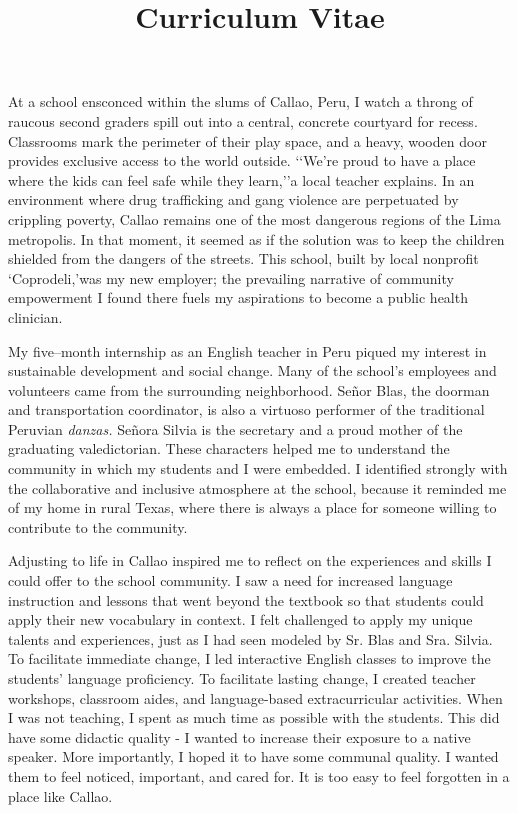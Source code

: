 \documentclass[12pt,a4paper,roman]{moderncv} %
\title{Curriculum Vitae}
\begin{document}


\clearpage


At a school ensconced within the slums of Callao, Peru, I watch a throng of raucous second graders spill out into a central, concrete courtyard for recess. Classrooms mark the perimeter of their play space, and a heavy, wooden door provides exclusive access to the world outside. \lq\lq We're proud to have a place where the kids can feel safe while they learn,\rq\rq\space a local teacher explains. In an environment where drug trafficking and gang violence are perpetuated by crippling poverty, Callao remains one of the most dangerous regions of the Lima metropolis. In that moment, it seemed as if the solution was to keep the children shielded from the dangers of the streets. This school, built by local nonprofit  \lq Coprodeli,\rq\space was my new employer; the prevailing narrative of community empowerment I found there fuels my aspirations to become a public health clinician.

\medskip
 
My five--month internship as an English teacher in Peru piqued my interest in sustainable development and social change. Many of the school's employees and volunteers came from the surrounding neighborhood. Se\~nor Blas, the doorman and transportation coordinator, is also a virtuoso performer of the traditional Peruvian \textit{danzas.} Se\~nora Silvia is the secretary and a proud mother of the graduating valedictorian.  These characters helped me to understand the community in which my students and I were embedded. I identified strongly with the collaborative and inclusive atmosphere at the school, because it reminded me of my home in rural Texas, where there is always a place for someone willing to contribute to the community.

\medskip

Adjusting to life in Callao inspired me to reflect on the experiences and skills I could offer to the school community. I saw a need for increased language instruction and lessons that went beyond the textbook so that students could apply their new vocabulary in context. I felt challenged to apply my unique talents and experiences, just as I had seen modeled by Sr. Blas and Sra. Silvia. To facilitate immediate change, I led interactive English classes to improve the students' language proficiency. To facilitate lasting change, I created teacher workshops, classroom aides, and language-based extracurricular activities.  When I was not teaching, I spent as much time as possible with the students. This did have some didactic quality - I wanted to increase their exposure to a native speaker. More importantly, I hoped it to have some communal quality. I wanted them to feel noticed, important, and cared for. It is too easy to feel forgotten in a place like Callao.
\end{document}
